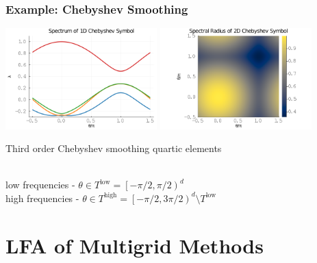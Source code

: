 \documentclass{beamer}
\begin{document}
\begin{frame}
\begin{center}
\frametitle{Example: Chebyshev Smoothing}

\includegraphics[height=3.9cm]{../img/ChebyshevSymbol1D}
\includegraphics[height=3.9cm]{../img/ChebyshevSymbol2D}

Third order Chebyshev smoothing quartic elements

~\\

low frequencies - $\theta \in T^{\text{low}} = \left[ - \pi / 2, \pi / 2 \right)^d$\\

high frequencies - $\theta \in T^{\text{high}} = \left[ - \pi / 2, 3 \pi / 2 \right)^d \setminus T^{\text{low}}$

\end{center}
\end{frame}

\section{LFA of Multigrid Methods}
\end{document}
